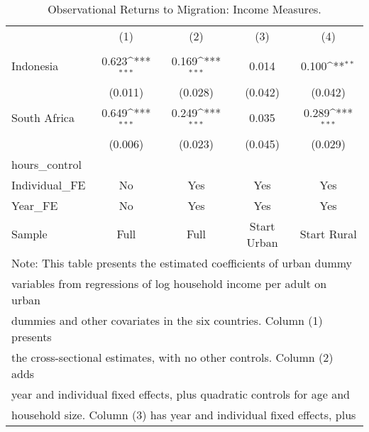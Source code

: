 \begin{table}[htbp]\centering
\def\sym#1{\ifmmode^{#1}\else\(^{#1}\)\fi}
\caption{Observational Returns to Migration: Income Measures.}
\begin{tabular}{l*{4}{c}}
\toprule
                    &\multicolumn{1}{c}{(1)}&\multicolumn{1}{c}{(2)}&\multicolumn{1}{c}{(3)}&\multicolumn{1}{c}{(4)}\\
                    &\multicolumn{1}{c}{} &\multicolumn{1}{c}{} &\multicolumn{1}{c}{} &\multicolumn{1}{c}{} \\
\midrule
Indonesia           &       0.623\sym{***}&       0.169\sym{***}&       0.014         &       0.100\sym{**} \\
                    &     (0.011)         &     (0.028)         &     (0.042)         &     (0.042)         \\
\addlinespace
South Africa        &       0.649\sym{***}&       0.249\sym{***}&       0.035         &       0.289\sym{***}\\
                    &     (0.006)         &     (0.023)         &     (0.045)         &     (0.029)         \\
\midrule
hours\_control       &                     &                     &                     &                     \\
Individual\_FE       &          No         &         Yes         &         Yes         &         Yes         \\
Year\_FE             &          No         &         Yes         &         Yes         &         Yes         \\
Sample              &        Full         &        Full         & Start Urban         & Start Rural         \\
\bottomrule
\multicolumn{5}{l}{\footnotesize Note: This table presents the estimated coefficients of urban dummy}\\
\multicolumn{5}{l}{\footnotesize variables from regressions of log household income per adult on urban}\\
\multicolumn{5}{l}{\footnotesize dummies and other covariates in the six countries. Column (1) presents}\\
\multicolumn{5}{l}{\footnotesize the cross-sectional estimates, with no other controls. Column (2) adds}\\
\multicolumn{5}{l}{\footnotesize year and individual fixed effects, plus quadratic controls for age and}\\
\multicolumn{5}{l}{\footnotesize household size. Column (3) has year and individual fixed effects, plus}\\

\end{tabular}
\end{table}
